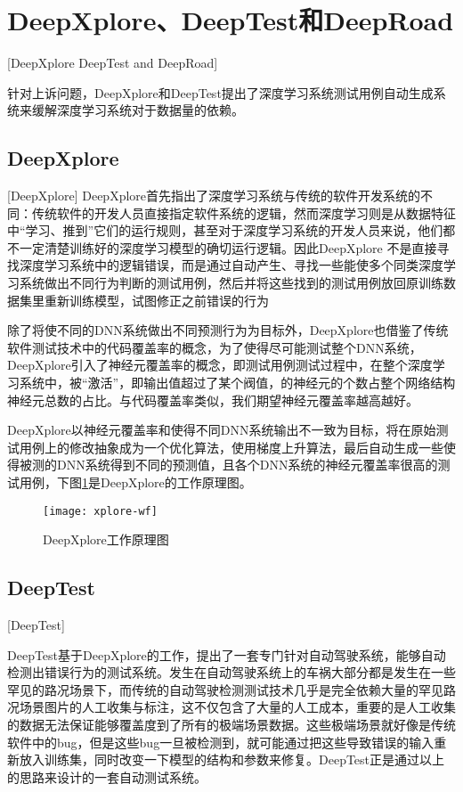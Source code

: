 \section{DeepXplore、DeepTest和DeepRoad}[DeepXplore DeepTest and DeepRoad]

针对上诉问题，DeepXplore和DeepTest提出了深度学习系统测试用例自动生成系统来缓解深度学习系统对于数据量的依赖。

\subsection{DeepXplore}[DeepXplore]
DeepXplore首先指出了深度学习系统与传统的软件开发系统的不同：传统软件的开发人员直接指定软件系统的逻辑，然而深度学习则是从数据特征中“学习、推到”它们的运行规则，甚至对于深度学习系统的开发人员来说，他们都不一定清楚训练好的深度学习模型的确切运行逻辑。因此DeepXplore
不是直接寻找深度学习系统中的逻辑错误，而是通过自动产生、寻找一些能使多个同类深度学习系统做出不同行为判断的测试用例，然后并将这些找到的测试用例放回原训练数据集里重新训练模型，试图修正之前错误的行为

除了将使不同的DNN系统做出不同预测行为为目标外，DeepXplore也借鉴了传统软件测试技术中的代码覆盖率的概念，为了使得尽可能测试整个DNN系统，DeepXplore引入了神经元覆盖率的概念，即测试用例测试过程中，在整个深度学习系统中，被“激活”，即输出值超过了某个阀值，的神经元的个数占整个网络结构神经元总数的占比。与代码覆盖率类似，我们期望神经元覆盖率越高越好。

DeepXplore以神经元覆盖率和使得不同DNN系统输出不一致为目标，将在原始测试用例上的修改抽象成为一个优化算法，使用梯度上升算法，最后自动生成一些使得被测的DNN系统得到不同的预测值，且各个DNN系统的神经元覆盖率很高的测试用例，下图\ref{xplore-wf}是DeepXplore的工作原理图。

\begin{figure}[h]
    \centering
    \texttt{[image: xplore-wf]}
    \caption{DeepXplore工作原理图\cite[图~5]{DeepXplore}}
    \label{xplore-wf}
\end{figure}

\subsection{DeepTest}[DeepTest]

DeepTest基于DeepXplore的工作，提出了一套专门针对自动驾驶系统，能够自动检测出错误行为的测试系统。发生在自动驾驶系统上的车祸大部分都是发生在一些罕见的路况场景下，而传统的自动驾驶检测测试技术几乎是完全依赖大量的罕见路况场景图片的人工收集与标注，这不仅包含了大量的人工成本，重要的是人工收集的数据无法保证能够覆盖度到了所有的极端场景数据。这些极端场景就好像是传统软件中的bug，但是这些bug一旦被检测到，就可能通过把这些导致错误的输入重新放入训练集，同时改变一下模型的结构和参数来修复。DeepTest正是通过以上的思路来设计的一套自动测试系统。

